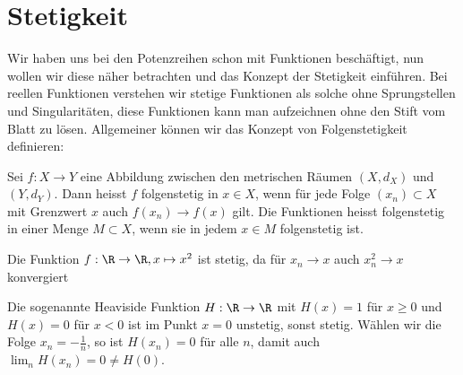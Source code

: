 \documentclass[letterpaper,10pt,english]{jupyterBook}
\begin{document}
\chapter{Stetigkeit}
\label{\detokenize{stetigkeit/stetigkeit:stetigkeit}}\label{\detokenize{stetigkeit/stetigkeit::doc}}
Wir haben uns bei den Potenzreihen schon mit Funktionen beschäftigt, nun wollen wir diese näher betrachten und das Konzept der Stetigkeit einführen. Bei reellen Funktionen verstehen wir stetige Funktionen als solche ohne Sprungstellen und Singularitäten, diese Funktionen kann man aufzeichnen ohne den Stift vom Blatt zu lösen. Allgemeiner können wir das Konzept von Folgenstetigkeit definieren:
\label{stetigkeit/stetigkeit:definition-0}
\begin{definition}{}{}



Sei \(f: X \rightarrow Y\) eine Abbildung zwischen den metrischen Räumen \((X,d_X)\) und \((Y,d_Y)\). Dann heisst \(f\) folgenstetig in \(x \in X\), wenn für jede Folge \((x_n) \subset X\) mit Grenzwert \(x\) auch \(f(x_n) \rightarrow f(x)\) gilt. Die Funktionen heisst folgenstetig in einer Menge \(M \subset X\), wenn sie in jedem \(x \in M\) folgenstetig ist.
\end{definition}
\label{stetigkeit/stetigkeit:example-1}
\begin{example}{}{}



Die Funktion \(f: \R \rightarrow \R, x \mapsto x^2\) ist stetig, da für \(x_n \rightarrow x\) auch \(x_n^2 \rightarrow x\) konvergiert
\end{example}
\label{stetigkeit/stetigkeit:example-2}
\begin{example}{}{}



Die sogenannte Heaviside Funktion \(H: \R \rightarrow \R\) mit \(H(x) = 1\) für \(x \geq 0\) und \(H(x)=0\) für \(x < 0\) ist im Punkt \(x =0\) unstetig, sonst stetig. Wählen wir die Folge \(x_n = -\frac{1}n\), so ist \(H(x_n) = 0\) für alle \(n\), damit auch \(\lim_n H(x_n) = 0 \neq H(0)\).
\end{example}
\end{document}
